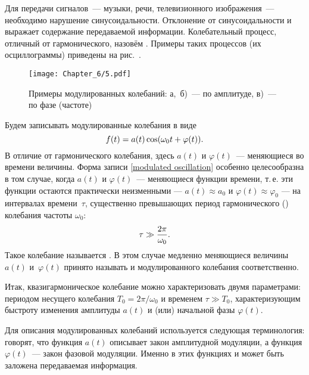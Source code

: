 
Для передачи сигналов~--- музыки, речи, телевизионного изображения~---
необходимо нарушение синусоидальности. Отклонение
от синусоидальности и выражает содержание передаваемой информации. Колебательный
процесс, отличный от гармонического,
назовём . Примеры таких процессов (их
осциллограммы) приведены на рис.~.

\begin{figure}[h!]
    \texttt{[image: Chapter\_6/5.pdf]}
    \caption{Примеры модулированных колебаний: а,~б)~--- по амплитуде,
    в)~--- по фазе (частоте)}
\end{figure}

Будем записывать модулированные колебания в виде
\begin{equation}
    \eqmark{modulated oscillation}
    f(t)=a(t)\cos(\omega_0t+\varphi(t)).
\end{equation}
В отличие от гармонического колебания, здесь $a(t)$ и $\varphi(t)$~---
меняющиеся во времени величины. Форма записи \eqref{modulated oscillation}
особенно целесообразна в том случае, когда $a(t)$ и $\varphi(t)$~---
 меняющиеся функции времени, т.\,е.
эти функции остаются практически неизменными --- $a(t)\approx a_{0}$ и
$\varphi(t)\approx\varphi_0$ --- на интервалах времени~$\tau$,
существенно превышающих период гармонического ()
колебания частоты $\omega_0$:
\begin{equation}
    \eqmark{quasiharmonic oscillation - tau}
    \tau \gg \frac{2\pi}{\omega_0}.
\end{equation}
Такое колебание называется .
В этом случае медленно меняющиеся величины~$a(t)$ и~$\varphi(t)$
принято называть  и  модулированного колебания
соответственно.

Итак, квазигармоническое колебание можно характеризовать двумя параметрами:
периодом несущего колебания $T_0=2\pi/\omega_0$ и временем $\tau \gg T_0$,
характеризующим быстроту изменения амплитуды $a(t)$ и (или) начальной
фазы $\varphi(t)$.

Для описания модулированных колебаний используется
следующая терминология: говорят, что функция $a(t)$ описывает закон амплитудной
модуляции, а функция $\varphi(t)$~--- закон
фазовой модуляции. Именно в этих функциях и может быть заложена
передаваемая информация.


